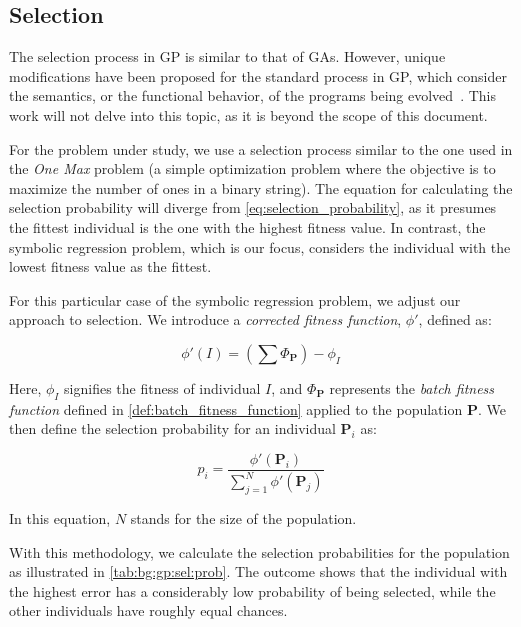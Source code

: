 \subsection{Selection}
\label{sec:background:genetic_programming:selection}
  The selection process in GP is similar to that of GAs.
  However, unique modifications have been proposed for the standard process in 
  GP, which consider the semantics, or the functional behavior, of the programs 
  being evolved~\autocite{liskowskiComparisonSemanticawareSelection2015}.
  This work will not delve into this topic, as it is beyond the scope of this
  document.

  For the problem under study, we use a selection process similar to the one 
  used in the \textit{One Max} problem (a simple optimization problem where the 
  objective is to maximize the number of ones in a binary string).
  The equation for calculating the selection probability will diverge from 
  \vref{eq:selection_probability}, as it presumes the fittest individual is the 
  one with the highest fitness value.
  In contrast, the symbolic regression problem, which is our focus, considers the
  individual with the lowest fitness value as the fittest.

  For this particular case of the symbolic regression problem, we adjust our 
  approach to selection.
  We introduce a \emph{corrected fitness function}, \(\phi'\), defined as:

  \begin{equation}
    \label{eq:bg:gp:sym:corrected_fitness}
    \phi'(I) = \left(\sum \Phi_\mathbf{P}\right) - \phi_I
  \end{equation}

  Here, \(\phi_I\) signifies the fitness of individual \(I\), and 
  \(\Phi_\mathbf{P}\) represents the \textit{batch fitness function} defined in 
  \vref{def:batch_fitness_function} applied to the population \(\mathbf{P}\).
  We then define the selection probability for an individual \(\mathbf{P}_i\) as:

  \begin{equation}
    \label{eq:bg:gp:sym:selection_probability}
    p_i = \frac{\phi'(\mathbf{P}_i)}{\sum_{j = 1}^N \phi'(\mathbf{P}_j)}
  \end{equation}

  In this equation, \(N\) stands for the size of the population.

  With this methodology, we calculate the selection probabilities for the 
  population as illustrated in \vref{tab:bg:gp:sel:prob}.
  The outcome shows that 
  the individual with the highest error has a considerably low probability of 
  being selected, while the other individuals have roughly equal chances.

